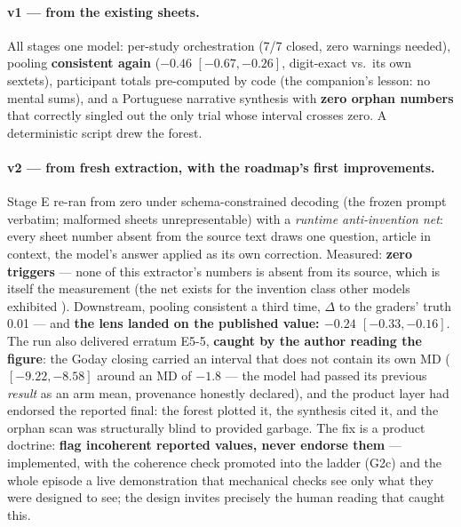 \documentclass[11pt]{article}
\begin{document}
\paragraph{v1 --- from the existing sheets.} All stages one model: per-study orchestration (7/7 closed, zero warnings needed), pooling \textbf{consistent again} ($-0.46$ $[-0.67, -0.26]$, digit-exact vs.\ its own sextets), participant totals pre-computed by code (the companion's lesson: no mental sums), and a Portuguese narrative synthesis with \textbf{zero orphan numbers} that correctly singled out the only trial whose interval crosses zero. A deterministic script drew the forest.

\paragraph{v2 --- from fresh extraction, with the roadmap's first improvements.} Stage E re-ran from zero under schema-constrained decoding (the frozen prompt verbatim; malformed sheets unrepresentable) with a \emph{runtime anti-invention net}: every sheet number absent from the source text draws one question, article in context, the model's answer applied as its own correction. Measured: \textbf{zero triggers} --- none of this extractor's numbers is absent from its source, which is itself the measurement (the net exists for the invention class other models exhibited \citep{barra2026extrai2}). Downstream, pooling consistent a third time, $\Delta$ to the graders' truth 0.01 --- and \textbf{the lens landed on the published value: $-0.24$ $[-0.33, -0.16]$}. The run also delivered erratum E5-5, \textbf{caught by the author reading the figure}: the Goday closing carried an interval that does not contain its own MD ($[-9.22, -8.58]$ around an MD of $-1.8$ --- the model had passed its previous \emph{result} as an arm mean, provenance honestly declared), and the product layer had endorsed the reported final: the forest plotted it, the synthesis cited it, and the orphan scan was structurally blind to provided garbage. The fix is a product doctrine: \textbf{flag incoherent reported values, never endorse them} --- implemented, with the coherence check promoted into the ladder (G2c) and the whole episode a live demonstration that mechanical checks see only what they were designed to see; the design invites precisely the human reading that caught this.
\end{document}
